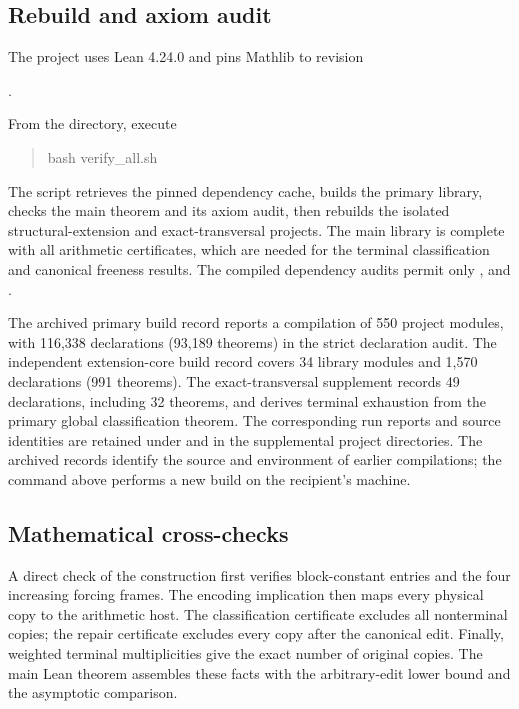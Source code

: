 \subsection{Rebuild and axiom audit}
The project uses Lean 4.24.0 and pins Mathlib to revision
\begin{center}.\end{center}
From the  directory, execute
\begin{quote}\ttfamily\small
bash verify\_all.sh
\end{quote}
The script retrieves the pinned dependency cache, builds the primary
library, checks the main theorem and its axiom audit, then rebuilds the
isolated structural-extension and exact-transversal projects. The main
library is complete with all arithmetic certificates, which are needed
for the terminal classification and canonical freeness results.
The compiled dependency audits permit only ,
 and .

The archived primary build record reports a compilation of
550 project modules, with 116,338 declarations (93,189 theorems)
in the strict declaration audit. The independent extension-core
build record covers 34 library modules and 1,570 declarations
(991 theorems). The exact-transversal supplement records 49 declarations,
including 32 theorems, and derives terminal exhaustion from the primary
global classification theorem. The corresponding run reports and source
identities are retained under  and in the supplemental
project directories. The archived records identify the source and environment of earlier
compilations; the command above performs a new build on the recipient's machine.

\subsection{Mathematical cross-checks}
A direct check of the construction first verifies block-constant entries
and the four increasing forcing frames. The encoding implication then
maps every physical copy to the arithmetic host. The classification
certificate excludes all nonterminal copies; the repair certificate
excludes every copy after the canonical edit. Finally, weighted terminal
multiplicities give the exact number of original copies. The main
Lean theorem assembles these facts with the arbitrary-edit lower bound
and the asymptotic comparison.
